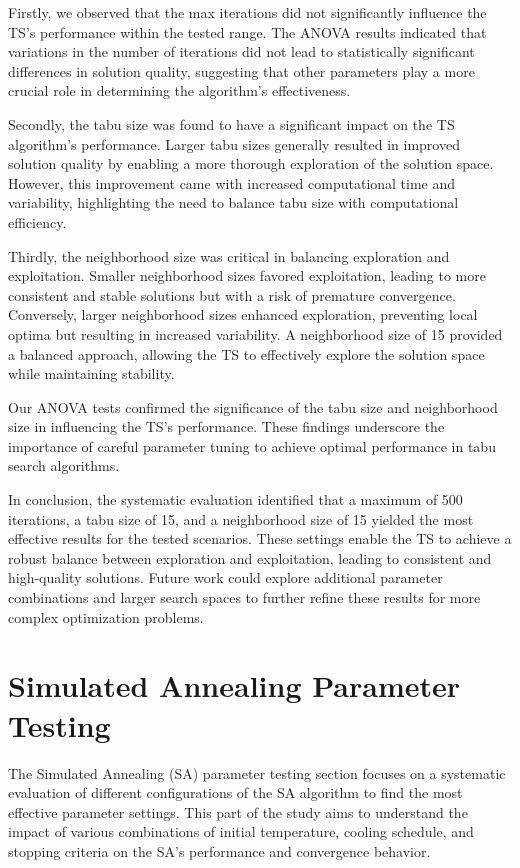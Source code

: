 \documentclass{article}
\begin{document}
    Firstly, we observed that the max iterations did not significantly influence the TS’s performance within the tested range. The ANOVA results indicated that variations in the number of iterations did not lead to statistically significant differences in solution quality, suggesting that other parameters play a more crucial role in determining the algorithm's effectiveness.

    Secondly, the tabu size was found to have a significant impact on the TS algorithm's performance. Larger tabu sizes generally resulted in improved solution quality by enabling a more thorough exploration of the solution space. However, this improvement came with increased computational time and variability, highlighting the need to balance tabu size with computational efficiency.

    Thirdly, the neighborhood size was critical in balancing exploration and exploitation. Smaller neighborhood sizes favored exploitation, leading to more consistent and stable solutions but with a risk of premature convergence. Conversely, larger neighborhood sizes enhanced exploration, preventing local optima but resulting in increased variability. A neighborhood size of 15 provided a balanced approach, allowing the TS to effectively explore the solution space while maintaining stability.

    Our ANOVA tests confirmed the significance of the tabu size and neighborhood size in influencing the TS’s performance. These findings underscore the importance of careful parameter tuning to achieve optimal performance in tabu search algorithms.

    In conclusion, the systematic evaluation identified that a maximum of 500 iterations, a tabu size of 15, and a neighborhood size of 15 yielded the most effective results for the tested scenarios. These settings enable the TS to achieve a robust balance between exploration and exploitation, leading to consistent and high-quality solutions. Future work could explore additional parameter combinations and larger search spaces to further refine these results for more complex optimization problems.


    \newpage


    \section{Simulated Annealing Parameter Testing}

    The Simulated Annealing (SA) parameter testing section focuses on a systematic evaluation of different configurations of the SA algorithm to find the most effective parameter settings.
    This part of the study aims to understand the impact of various combinations of initial temperature, cooling schedule, and stopping criteria on the SA’s performance and convergence behavior.
\end{document}
